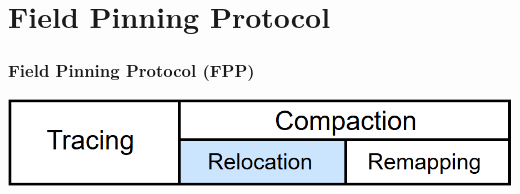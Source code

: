 \documentclass{beamer}
\newcommand{\linespace}{\vskip 0.25cm}
\begin{document}
%
%
%
%
%
%
%
%
%
%
%



\section[FPP]{Field Pinning Protocol}

\begin{frame}

\frametitle{Field Pinning Protocol (FPP)}

\begin{center}
\includegraphics[width=.85\textwidth]{Illustrations/gc_cycle_locator_relocation.png}
\end{center}

\end{frame}
\end{document}

